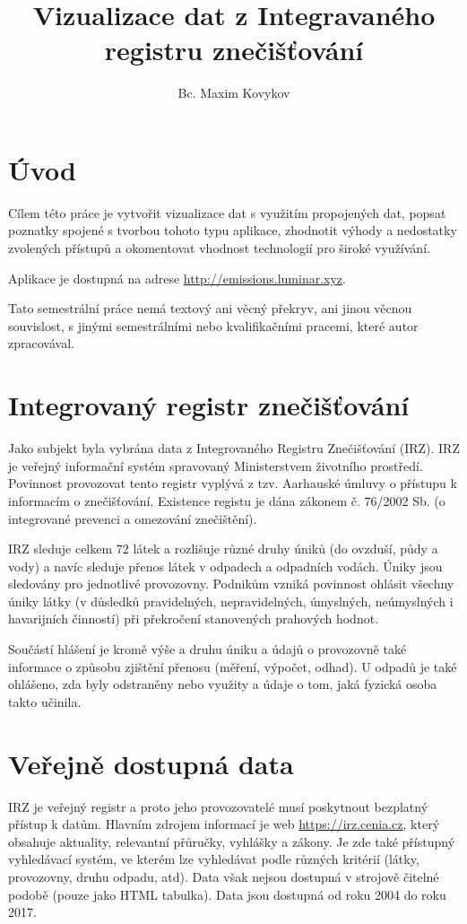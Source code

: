 \documentclass[12pt]{article}
\title{Vizualizace dat z Integravaného registru znečišťování}
\author{Bc. Maxim Kovykov}
\begin{document}
	
\begin{titlepage}
	\maketitle
	\thispagestyle{empty}
\end{titlepage}

\newpage


\section*{Úvod}
Cílem této práce je vytvořit vizualizace dat s využitím propojených dat, popsat poznatky spojené s tvorbou tohoto typu aplikace, zhodnotit výhody a nedostatky zvolených přístupů a okomentovat vhodnost technologií pro široké využívání.

Aplikace je dostupná na adrese \url{http://emissions.luminar.xyz}.

Tato semestrální práce nemá textový ani věcný překryv, ani jinou věcnou souvislost, s jinými semestrálními nebo kvalifikačními pracemi, které autor zpracovával.


\section*{Integrovaný registr znečišťování}
Jako subjekt byla vybrána data z Integrovaného Registru Znečišťování (IRZ). IRZ je veřejný informační systém spravovaný Ministerstvem životního prostředí. Povinnost provozovat tento registr vyplývá z tzv. Aarhauské úmluvy o přístupu k informacím o znečišťování. Existence registu je dána zákonem č. 76/2002 Sb. (o integrované prevenci a omezování znečištění).

IRZ sleduje celkem 72 látek a rozlišuje různé druhy úniků (do ovzduší, půdy a vody) a navíc sleduje přenos látek v odpadech a odpadních vodách. Úniky jsou sledovány pro jednotlivé provozovny. Podnikům vzniká povinnost ohlásit všechny úniky látky (v důsledků pravidelných, nepravidelných, úmyslných, neúmyslných i havarijních činností) při překročení stanovených prahových hodnot.

Součástí hlášení je kromě výše a druhu úniku a údajů o provozovně také informace o způsobu zjištění přenosu (měření, výpočet, odhad). U odpadů je také ohlášeno, zda byly odstraněny nebo využity a údaje o tom, jaká fyzická osoba takto učinila.


\section*{Veřejně dostupná data}
IRZ je veřejný registr a proto jeho provozovatelé musí poskytnout bezplatný přístup k datům. Hlavním zdrojem informací je web \url{https://irz.cenia.cz}, který obsahuje aktuality, relevantní přůručky, vyhlášky a zákony. Je zde také přístupný vyhledávací systém, ve kterém lze vyhledávat podle různých kritérií (látky, provozovny, druhu odpadu, atd). Data však nejsou dostupná v strojově čitelné podobě (pouze jako HTML tabulka). Data jsou dostupná od roku 2004 do roku 2017.
\end{document}
